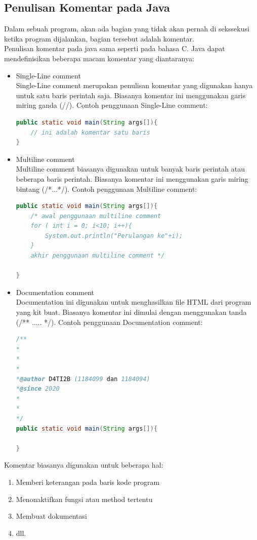 \subsection{Penulisan Komentar pada Java}
Dalam sebuah program, akan ada bagian yang tidak akan pernah di sekssekusi ketika program dijalankan, bagian tersebut adalah komentar.\\
Penulisan komentar pada java sama seperti pada bahasa C. Java dapat mendefinisikan beberapa macam komentar yang diantaranya: 
\begin{itemize}
    \item Single-Line comment\\
    Single-Line comment merupakan penulisan komentar yang digunakan hanya untuk satu baris perintah saja. Biasanya komentar ini menggunakan garis miring ganda \textcolor{pred}{(//)}. Contoh penggunaan Single-Line comment: 
    \begin{lstlisting}[language=Java]
public static void main(String args[]){
    // ini adalah komentar satu baris
}
    \end{lstlisting}

    \item Multiline comment\\
    Multiline comment biasanya digunakan untuk banyak baris perintah atau beberapa baris perintah. Biasanya komentar ini menggunakan garis miring bintang \textcolor{pred}{(/*...*/)}. Contoh penggunaan Multiline comment:
    \begin{lstlisting}[language=Java]
public static void main(String args[]){
    /* awal penggunaan multiline comment
    for ( int i = 0; i<10; i++){
        System.out.println("Perulangan ke"+i);
    }
    akhir penggunaan multiline comment */

}
    \end{lstlisting}

    \item Documentation comment\\
    Documentation ini digunakan untuk menghasilkan file HTML dari program yang kit buat. Biasanya komentar ini dimulai dengan menggunakan tanda \textcolor{pred}{(/** ..... */)}. Contoh penggunaan Documentation comment:
    \begin{lstlisting}[language=Java]
/**
*
*
*
*@author D4TI2B (1184099 dan 1184094)
*@since 2020
*
*
*/
public static void main(String args[]){

}
    \end{lstlisting}

\end{itemize}
Komentar biasanya digunakan untuk beberapa hal:
\begin{enumerate}
    \item Memberi keterangan pada baris kode program
    \item Menonaktifkan fungsi atau method tertentu
    \item Membuat dokumentasi
    \item dll.
\end{enumerate}

